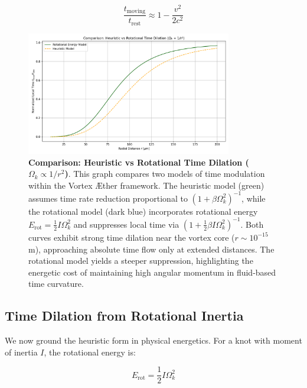 \begin{equation}
\frac{t_{\text{moving}}}{t_{\text{rest}}} \approx 1 - \frac{v^2}{2 c^2}\label{eq:lorentz_time_dilation}
\end{equation}

\begin{figure}[htbp]
    \centering
    \includegraphics[width=0.8\textwidth]{RotationalVsHeuristicTimeDilation}
    \caption{\textbf{Comparison: Heuristic vs Rotational Time Dilation (\(\Omega_k \propto 1/r^2\))}.
    This graph compares two models of time modulation within the Vortex Æther framework.
    The heuristic model (green) assumes time rate reduction proportional to \((1 + \beta \Omega_k^2)^{-1}\),
        while the rotational model (dark blue) incorporates rotational energy \(E_{\text{rot}} = \frac{1}{2} I \Omega_k^2\) and suppresses local time via
        \((1 + \frac{1}{2} \beta I \Omega_k^2)^{-1}\). Both curves exhibit strong time dilation near the vortex core (\(r \sim 10^{-15}\) m),
        approaching absolute time flow only at extended distances. The rotational model yields a steeper suppression,
        highlighting the energetic cost of maintaining high angular momentum in fluid-based time curvature.
    }
    \label{fig:radial_time_profile}
\end{figure}

\subsection{Time Dilation from Rotational Inertia}

We now ground the heuristic form in physical energetics. For a knot with moment of inertia $I$, the rotational energy is:

\begin{equation}
E_{\text{rot}} = \frac{1}{2} I \Omega_k^2\label{eq:rotational_energy}
\end{equation}

